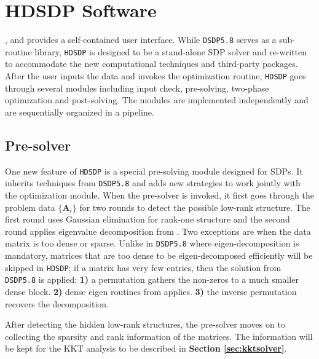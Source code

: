 \section{HDSDP Software}\label{sec5}

, and provides a
self-contained user interface. While {{\texttt{DSDP5.8}}} serves as a sub-routine library, 
{{\texttt{HDSDP}}} is designed to be a stand-alone SDP solver and re-written to accommodate the 
new computational techniques and third-party packages. After the user inputs the data and invokes the optimization routine, {{\texttt{HDSDP}}} goes through several modules
including input check, pre-solving, two-phase optimization and post-solving. The modules are implemented independently and are sequentially organized in a pipeline. 

\subsection{Pre-solver}

One new feature of {{\texttt{HDSDP}}} is a special pre-solving module
 designed for SDPs. It inherits techniques from {{\texttt{DSDP5.8}}} and adds new strategies to work jointly with the optimization module. When the pre-solver is invoked, it first goes through the problem data $\{ \mathbf{A}_i \}$ for two rounds to detect the possible low-rank structure. The first round uses Gaussian elimination for rank-one structure and the
second round applies eigenvalue decomposition from . Two
exceptions are when the data matrix is too dense or sparse. Unlike in {{\texttt{DSDP5.8}}} where eigen-decomposition is mandatory, matrices that are too dense to be eigen-decomposed efficiently will be skipped in {{\texttt{HDSDP}}}; if a matrix has very few entries, then the solution from {{\texttt{DSDP5.8}}} is applied: {\textbf{1)}} a permutation gathers the non-zeros to a much smaller dense block. {\textbf{2)}} dense eigen routines from  applies. {\textbf{3)}} the inverse permutation recovers the decomposition.

After detecting the hidden low-rank structures, the pre-solver moves on to collecting the sparsity and rank information of the matrices. The information will be kept for the KKT analysis to be described in \textbf{Section \ref{sec:kktsolver}}.

